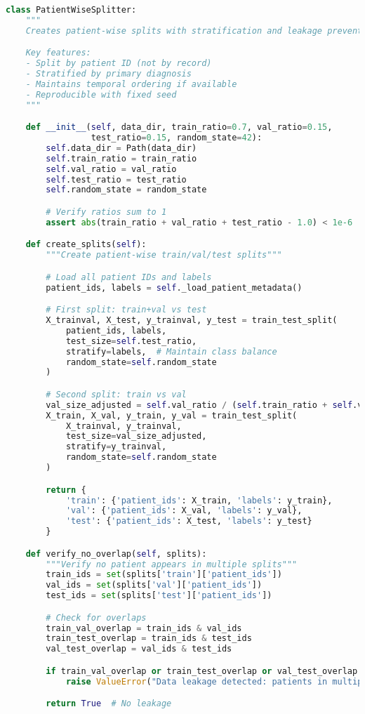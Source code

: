 \documentclass[11pt]{article}
\begin{document}
\begin{lstlisting}[language=Python, caption=Patient-Wise Stratified Splitting]
class PatientWiseSplitter:
    """
    Creates patient-wise splits with stratification and leakage prevention.

    Key features:
    - Split by patient ID (not by record)
    - Stratified by primary diagnosis
    - Maintains temporal ordering if available
    - Reproducible with fixed seed
    """

    def __init__(self, data_dir, train_ratio=0.7, val_ratio=0.15,
                 test_ratio=0.15, random_state=42):
        self.data_dir = Path(data_dir)
        self.train_ratio = train_ratio
        self.val_ratio = val_ratio
        self.test_ratio = test_ratio
        self.random_state = random_state

        # Verify ratios sum to 1
        assert abs(train_ratio + val_ratio + test_ratio - 1.0) < 1e-6

    def create_splits(self):
        """Create patient-wise train/val/test splits"""

        # Load all patient IDs and labels
        patient_ids, labels = self._load_patient_metadata()

        # First split: train+val vs test
        X_trainval, X_test, y_trainval, y_test = train_test_split(
            patient_ids, labels,
            test_size=self.test_ratio,
            stratify=labels,  # Maintain class balance
            random_state=self.random_state
        )

        # Second split: train vs val
        val_size_adjusted = self.val_ratio / (self.train_ratio + self.val_ratio)
        X_train, X_val, y_train, y_val = train_test_split(
            X_trainval, y_trainval,
            test_size=val_size_adjusted,
            stratify=y_trainval,
            random_state=self.random_state
        )

        return {
            'train': {'patient_ids': X_train, 'labels': y_train},
            'val': {'patient_ids': X_val, 'labels': y_val},
            'test': {'patient_ids': X_test, 'labels': y_test}
        }

    def verify_no_overlap(self, splits):
        """Verify no patient appears in multiple splits"""
        train_ids = set(splits['train']['patient_ids'])
        val_ids = set(splits['val']['patient_ids'])
        test_ids = set(splits['test']['patient_ids'])

        # Check for overlaps
        train_val_overlap = train_ids & val_ids
        train_test_overlap = train_ids & test_ids
        val_test_overlap = val_ids & test_ids

        if train_val_overlap or train_test_overlap or val_test_overlap:
            raise ValueError("Data leakage detected: patients in multiple splits!")

        return True  # No leakage
\end{lstlisting}
\end{document}
